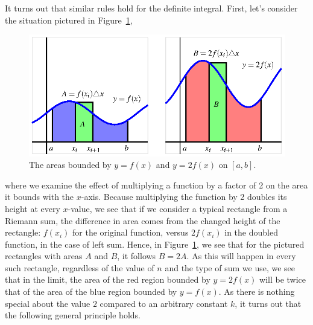 It turns out that similar rules hold for the definite integral.  First, let's consider the situation pictured in Figure~\ref{F:4.3.ConstMult},
\begin{figure}[h]
\begin{center}
\includegraphics{figures/4_3_ConstMult.eps}
\caption{The areas bounded by $y = f(x)$ and $y = 2f(x)$ on $[a,b]$.} \label{F:4.3.ConstMult}
\end{center}
\end{figure}
where we examine the effect of multiplying a function by a factor of 2 on the area it bounds with the $x$-axis.  Because multiplying the function by 2 doubles its height at every $x$-value, we see that if we consider a typical rectangle from a Riemann sum, the difference in area comes from the changed height of the rectangle:  $f(x_i)$ for the original function, versus $2f(x_i)$ in the doubled function, in the case of left sum.  Hence, in Figure~\ref{F:4.3.ConstMult}, we see that for the pictured rectangles with areas $A$ and $B$, it follows $B = 2A$.  As this will happen in every such rectangle, regardless of the value of $n$ and the type of sum we use, we see that in the limit, the area of the red region bounded by $y = 2f(x)$ will be twice that of the area of the blue region bounded by $y = f(x)$.  As there is nothing special about the value $2$ compared to an arbitrary constant $k$, it turns out that the following general principle holds.

\vspace*{5pt}
\nin {}
\vspace*{1pt}

